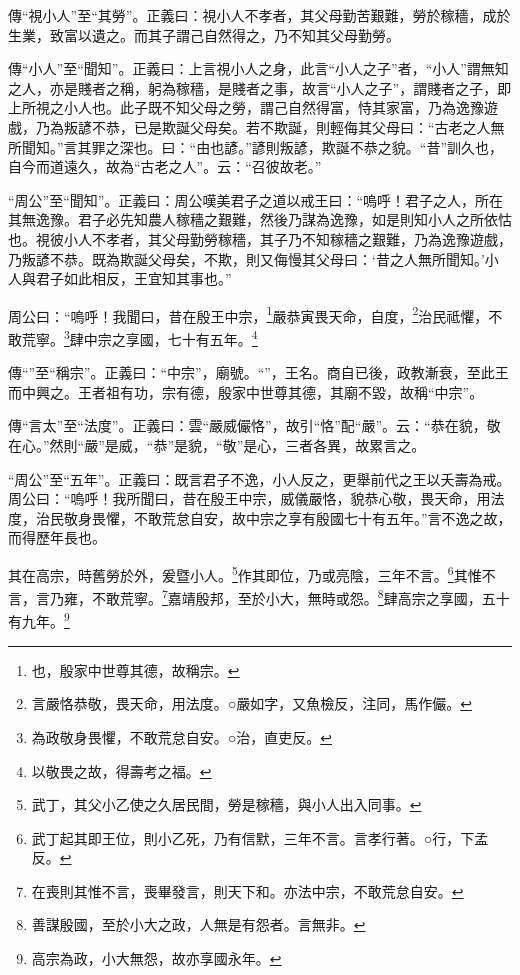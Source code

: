 {\noindent\zhuan{}\fzbyks 傳“視小人”至“其勞”。正義曰：視小人不孝者，其父母勤苦艱難，勞於稼穡，成於生業，致富以遺之。而其子謂己自然得之，乃不知其父母勤勞。 \par}

{\noindent\zhuan{}\fzbyks 傳“小人”至“聞知”。正義曰：上言視小人之身，此言“小人之子”者，“小人”謂無知之人，亦是賤者之稱，躬為稼穡，是賤者之事，故言“小人之子”，謂賤者之子，即上所視之小人也。此子既不知父母之勞，謂己自然得富，恃其家富，乃為逸豫遊戲，乃為叛諺不恭，已是欺誕父母矣。若不欺誕，則輕侮其父母曰：“古老之人無所聞知。”言其罪之深也。曰：“由也諺。”諺則叛諺，欺誕不恭之貌。“昔”訓久也，自今而道遠久，故為“古老之人”。云：“召彼故老。” \par}

{\noindent\shu{}\fzkt “周公”至“聞知”。正義曰：周公嘆美君子之道以戒王曰：“嗚呼！君子之人，所在其無逸豫。君子必先知農人稼穡之艱難，然後乃謀為逸豫，如是則知小人之所依怙也。視彼小人不孝者，其父母勤勞稼穡，其子乃不知稼穡之艱難，乃為逸豫遊戲，乃叛諺不恭。既為欺誕父母矣，不欺，則又侮慢其父母曰：‘昔之人無所聞知。’小人與君子如此相反，王宜知其事也。” \par}

周公曰：“嗚呼！我聞曰，昔在殷王中宗，\footnote{也，殷家中世尊其德，故稱宗。}嚴恭寅畏天命，自度，\footnote{言嚴恪恭敬，畏天命，用法度。○嚴如字，又魚檢反，注同，馬作儼。}治民祗懼，不敢荒寧。\footnote{為政敬身畏懼，不敢荒怠自安。○治，直吏反。}肆中宗之享國，七十有五年。\footnote{以敬畏之故，得壽考之福。}


{\noindent\zhuan{}\fzbyks 傳“”至“稱宗”。正義曰：“中宗”，廟號。“”，王名。商自已後，政教漸衰，至此王而中興之。王者祖有功，宗有德，殷家中世尊其德，其廟不毀，故稱“中宗”。 \par}

{\noindent\zhuan{}\fzbyks 傳“言太”至“法度”。正義曰：雲“嚴威儼恪”，故引“恪”配“嚴”。云：“恭在貌，敬在心。”然則“嚴”是威，“恭”是貌，“敬”是心，三者各異，故累言之。 \par}

{\noindent\shu{}\fzkt “周公”至“五年”。正義曰：既言君子不逸，小人反之，更舉前代之王以夭壽為戒。周公曰：“嗚呼！我所聞曰，昔在殷王中宗，威儀嚴恪，貌恭心敬，畏天命，用法度，治民敬身畏懼，不敢荒怠自安，故中宗之享有殷國七十有五年。”言不逸之故，而得歷年長也。 \par}

其在高宗，時舊勞於外，爰暨小人。\footnote{武丁，其父小乙使之久居民間，勞是稼穡，與小人出入同事。}作其即位，乃或亮陰，三年不言。\footnote{武丁起其即王位，則小乙死，乃有信默，三年不言。言孝行著。○行，下孟反。}其惟不言，言乃雍，不敢荒寧。\footnote{在喪則其惟不言，喪畢發言，則天下和。亦法中宗，不敢荒怠自安。}嘉靖殷邦，至於小大，無時或怨。\footnote{善謀殷國，至於小大之政，人無是有怨者。言無非。}肆高宗之享國，五十有九年。\footnote{高宗為政，小大無怨，故亦享國永年。}


